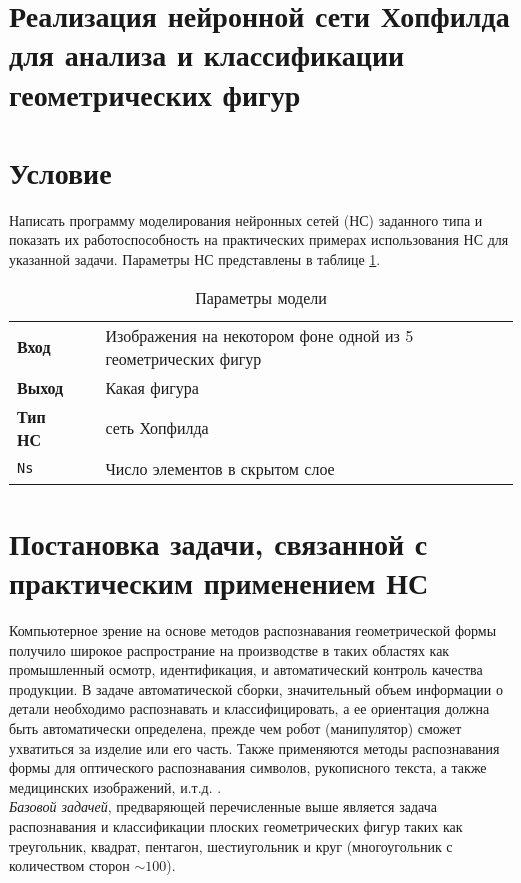 \documentclass[12pt,a4paper]{article}
\newcommand{\ns}{\texttt{Ns}}
\begin{document}
\section*{\Large\center Реализация нейронной сети Хопфилда
для анализа и классификации геометрических фигур}    
\section*{Условие}
\noindent
Написать программу моделирования нейронных сетей (НС) 
заданного типа и показать их работоспособность на практических примерах использования НС для указанной задачи.
Параметры НС представлены в таблице \ref{tbl:01}.

\begin{table}[h]
	\center
	\caption{Параметры модели \label{tbl:01}}
\begin{tabular}{lc|l}
\textbf{Вход} & & Изображения на некотором фоне одной из 5 геометрических фигур \\
\textbf{Выход} & & Какая фигура \\
\textbf{Тип НС} & & сеть Хопфилда \\
\textsf{\ns} &  & Число элементов в скрытом слое
\end{tabular}
\end{table}

\section{Постановка задачи, связанной с практическим \newline применением НС}
Компьютерное зрение на основе методов распознавания геометрической 
формы получило широкое распространие на производстве в таких областях 
как промышленный осмотр, идентификация, и автоматический контроль
качества продукции. 
В задаче автоматической сборки, значительный объем информации о детали
необходимо распознавать и классифицировать, а ее ориентация должна быть 
автоматически определена, прежде чем робот (манипулятор) сможет ухватиться 
за изделие или его часть. 
Также применяются методы распознавания формы
для оптического распознавания символов, рукописного текста,
а также медицинских изображений, и.т.д. \cite{hou1999}.\\[6pt]
\noindent
\emph{Базовой задачей}, предваряющей перечисленные выше является
задача распознавания и классификации плоских геометрических фигур
таких как треугольник, квадрат, пентагон, шестиугольник и круг 
(многоугольник с количеством сторон $\sim100$).
\end{document}
